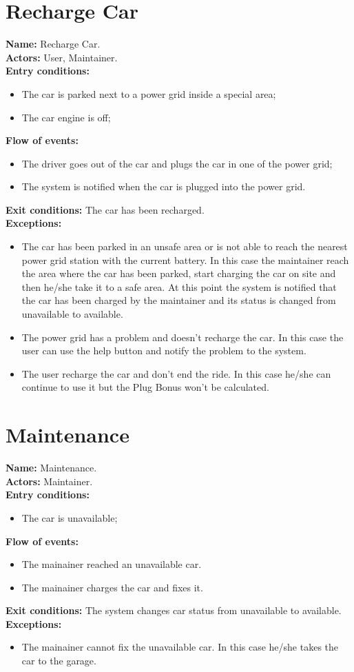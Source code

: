 \section*{Recharge Car}
\textbf{Name:} Recharge Car.\\
\textbf{Actors:} User, Maintainer.\\
\textbf{Entry conditions:}
\begin{itemize}
\item The car is parked next to a power grid inside a special area;
\item The car engine is off;
\end{itemize}
\textbf{Flow of events:}
\begin{itemize}
\item The driver goes out of the car and plugs the car in one of the power grid;
\item The system is notified when the car is plugged into the power grid.
\end{itemize}
\textbf{Exit conditions:} The car has been recharged.\\
\textbf{Exceptions:}
\begin{itemize}
\item The car has been parked in an unsafe area or is not able to reach the nearest power grid station with the current battery. In this case the maintainer reach the area where the car has been parked, start charging the car on site and then he/she take it to a safe area. At this point the system is notified that the car has been charged by the maintainer and its status is changed from unavailable to available.
\item The power grid has a problem and doesn't recharge the car. In this case the user can use the help button and notify the problem to the system.
\item The user recharge the car and don't end the ride. In this case he/she can continue to use it but the Plug Bonus won't be calculated.
\end{itemize}

\section*{Maintenance}
\textbf{Name:} Maintenance.\\
\textbf{Actors:} Maintainer.\\
\textbf{Entry conditions:}
\begin{itemize}
\item The car is unavailable;
\end{itemize}
\textbf{Flow of events:}
\begin{itemize}
\item The mainainer reached an unavailable car.
\item The mainainer charges the car and fixes it.
\end{itemize}
\textbf{Exit conditions:} The system changes car status from unavailable to available.\\
\textbf{Exceptions:}
\begin{itemize}
\item The mainainer cannot fix the unavailable car. In this case he/she takes the car to the garage.
\end{itemize}

